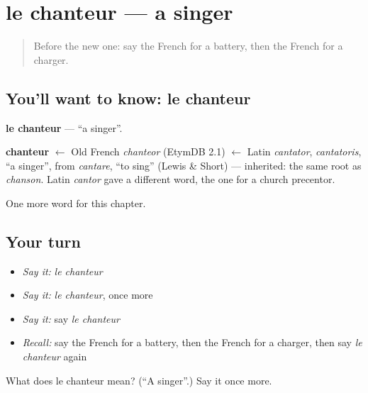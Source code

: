 \section[le chanteur]{le chanteur — a singer}

\label{lesson:FR-C223-chanteur}



\begin{quote}
Before the new one: say the French for a battery, then the French for a charger.
\end{quote}

\subsection*{You'll want to know: le chanteur}
\textbf{le chanteur} — \textquotedblleft{}a singer\textquotedblright{}.

\begin{cousinweb}
\textbf{chanteur} $\leftarrow$ Old French \emph{chanteor} (EtymDB 2.1) $\leftarrow$ Latin \emph{cantator}, \emph{cantatoris}, \textquotedblleft{}a singer\textquotedblright{}, from \emph{cantare}, \textquotedblleft{}to sing\textquotedblright{} (Lewis \& Short) — inherited: the same root as \emph{chanson}. Latin \emph{cantor} gave a different word, the one for a church precentor.
\end{cousinweb}

\begin{grammarlens}[title={What you've built}]
One more word for this chapter.
\end{grammarlens}

\subsection*{Your turn}
\begin{itemize}
\raggedright
  \item \emph{Say it:} \emph{le chanteur}
  \item \emph{Say it:} \emph{le chanteur}, once more
  \item \emph{Say it:} say \emph{le chanteur}
  \item \emph{Recall:} say the French for a battery, then the French for a charger, then say \emph{le chanteur} again
\end{itemize}

\begin{tcolorbox}[breakable,colback=teal!4,colframe=teal!35!black,title={Before you move on}]
What does le chanteur mean? (\textquotedblleft{}A singer\textquotedblright{}.) Say it once more.
\end{tcolorbox}
